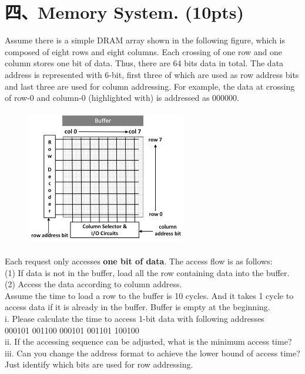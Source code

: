 \documentclass[UTF8]{ctexart}
\begin{document}
\section*{四、Memory System. (10pts)}
Assume there is a simple DRAM array shown in the following figure, which is composed of eight rows and eight columns. Each crossing of one row and one column
stores one bit of data. Thus, there are 64 bits data in total. The data address is represented with 6-bit, first three of which are used as row address bits and 
last three are used for column addressing. For example, the data at crossing of row-0 and column-0 (highlighted with) is addressed as 000000.\\
\begin{figure}[H]                                            
    \centering                                                
    \includegraphics[width=7cm,height=6cm]{4-1.png}        
    \caption*{}                                                                                 
\end{figure}  
Each request only accesses {\bfseries one bit of data}. The access flow is as follows:\\
(1) If data is not in the buffer, load all the row containing data into the buffer.\\
(2) Access the data according to column address.\\
Assume the time to load a row to the buffer is 10 cycles. And it takes 1 cycle to access data if it is already in the buffer. Buffer is empty at the beginning.\\
i. Please calculate the time to access 1-bit data with following addresses\\
000101 001100 000101 001101 100100\\
ii. If the accessing sequence can be adjusted, what is the minimum access time?\\
iii. Can you change the address format to achieve the lower bound of access time? Just identify which bits are used for row addressing.\\
\end{document}
